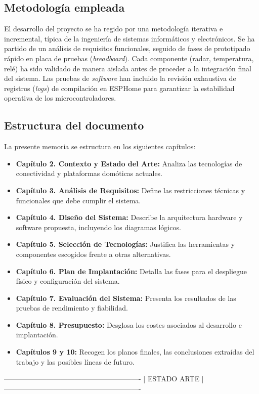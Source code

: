 \subsection{Metodología empleada}
El desarrollo del proyecto se ha regido por una metodología iterativa e incremental, típica de la ingeniería de sistemas informáticos y electrónicos. Se ha partido de un análisis de requisitos funcionales, seguido de fases de prototipado rápido en placa de pruebas (\textit{breadboard}). Cada componente (radar, temperatura, relé) ha sido validado de manera aislada antes de proceder a la integración final del sistema. Las pruebas de \textit{software} han incluido la revisión exhaustiva de registros (\textit{logs}) de compilación en ESPHome para garantizar la estabilidad operativa de los microcontroladores.

\subsection{Estructura del documento}
La presente memoria se estructura en los siguientes capítulos:
\begin{itemize}
    \item \textbf{Capítulo 2. Contexto y Estado del Arte:} Analiza las tecnologías de conectividad y plataformas domóticas actuales.
    \item \textbf{Capítulo 3. Análisis de Requisitos:} Define las restricciones técnicas y funcionales que debe cumplir el sistema.
    \item \textbf{Capítulo 4. Diseño del Sistema:} Describe la arquitectura hardware y software propuesta, incluyendo los diagramas lógicos.
    \item \textbf{Capítulo 5. Selección de Tecnologías:} Justifica las herramientas y componentes escogidos frente a otras alternativas.
    \item \textbf{Capítulo 6. Plan de Implantación:} Detalla las fases para el despliegue físico y configuración del sistema.
    \item \textbf{Capítulo 7. Evaluación del Sistema:} Presenta los resultados de las pruebas de rendimiento y fiabilidad.
    \item \textbf{Capítulo 8. Presupuesto:} Desglosa los costes asociados al desarrollo e implantación.
    \item \textbf{Capítulos 9 y 10:} Recogen los planos finales, las conclusiones extraídas del trabajo y las posibles líneas de futuro.
\end{itemize}


----------------------------------------------------------
|                     ESTADO ARTE                        |
----------------------------------------------------------




